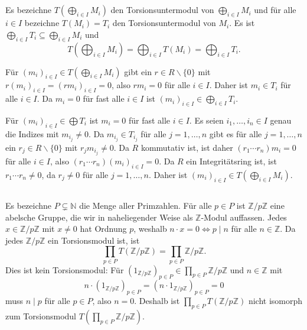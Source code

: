 \documentclass[a4paper,10pt]{article}
\theoremstyle{definition}
\newcommand{\N}{\mathbb{N}}
\newcommand{\Z}{\mathbb{Z}}
\begin{document}
\section{}





\section{}


\subsection{}
Es bezeichne $T(\bigoplus_{i \in I} M_i)$ den Torsionsuntermodul von $\bigoplus_{i \in I} M_i$ und für alle $i \in I$ bezeichne $T(M_i) = T_i$ den Torsionsuntermodul von $M_i$. Es ist $\bigoplus_{i \in I} T_i \subseteq \bigoplus_{i \in I} M_i$ und
\[
 T\left( \bigoplus_{i \in I} M_i \right) = \bigoplus_{i \in I} T(M_i) = \bigoplus_{i \in I} T_i.
\]

Für $(m_i)_{i \in I} \in T\left( \bigoplus_{i \in I} M_i \right)$ gibt ein $r \in R \smallsetminus \{0\}$ mit $r(m_i)_{i \in I} = (rm_{i})_{i \in I} = 0$, also $rm_i = 0$ für alle $i \in I$. Daher ist $m_i \in T_i$ für alle $i \in I$. Da $m_i = 0$ für fast alle $i \in I$ ist $(m_i)_{i \in I} \in \bigoplus_{i \in I} T_i$.

Für $(m_i)_{i \in I} \in \bigoplus T_i$ ist $m_i = 0$ für fast alle $i \in I$. Es seien $i_1, \ldots, i_n \in I$ genau die Indizes mit $m_{i_j} \neq 0$. Da $m_{i_j} \in T_{i_j}$ für alle $j=1,\ldots,n$ gibt es für alle $j=1,\ldots,n$ ein $r_j \in R \smallsetminus \{0\}$ mit $r_j m_{i_j} \neq 0$. Da $R$ kommutativ ist, ist daher $(r_1 \cdots r_n) m_i = 0$ für alle $i \in I$, also $(r_1 \cdots r_n) (m_i)_{i \in I} = 0$. Da $R$ ein Integritätsring ist, ist $r_1 \cdots r_n \neq 0$, da $r_j \neq 0$ für alle $j=1,\ldots,n$. Daher ist $(m_i)_{i \in I} \in T(\bigoplus_{i \in I} M_i)$.


\subsection{}
Es bezeichne $P \subsetneq \N$ die Menge aller Primzahlen. Für alle $p \in P$ ist $\Z/p\Z$ eine abelsche Gruppe, die wir in naheliegender Weise als $\Z$-Modul auffassen. Jedes $x \in \Z/p\Z$ mit $x \neq 0$ hat Ordnung $p$, weshalb $n \cdot x = 0 \Leftrightarrow p \mid n$ für alle $n \in \Z$. Da jedes $\Z/p\Z$ ein Torsionsmodul ist, ist
\[
 \prod_{p \in P} T(\Z/p\Z) = \prod_{p \in P} \Z/p\Z.
\]
Dies ist kein Torsionsmodul: Für $(1_{\Z/p\Z})_{p \in P} \in \prod_{p \in P} \Z/p\Z$ und $n \in \Z$ mit
\[
 n \cdot (1_{\Z/p\Z})_{p \in P} = (n \cdot 1_{\Z/p\Z})_{p \in P} = 0
\]
muss $n \mid p$ für alle $p \in P$, also $n = 0$. Deshalb ist $\prod_{p \in P} T(\Z/p\Z)$ nicht isomorph zum Torsionsmodul $T(\prod_{p \in P} \Z/p\Z)$.
\end{document}
